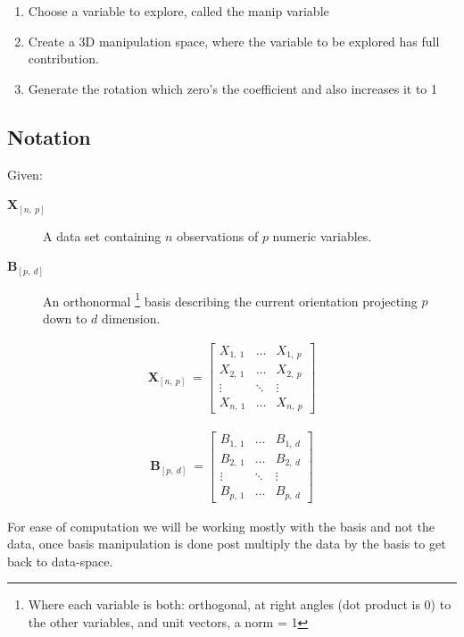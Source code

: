 \documentclass{monashthesis}
\begin{document}
\begin{enumerate}
\def\labelenumi{\arabic{enumi}.}
\tightlist
\item
  Choose a variable to explore, called the manip variable
\item
  Create a 3D manipulation space, where the variable to be explored has
  full contribution.
\item
  Generate the rotation which zero's the coefficient and also increases
  it to 1
\end{enumerate}

\subsection{Notation}\label{notation}

Given:

\begin{description}
  \item[$\textbf{X}_{[n,~p]}$] A data set containing $n$ observations of $p$ numeric variables. 
  \item[$\textbf{B}_{[p,~d]}$] An orthonormal \footnote{Where each variable is both: orthogonal, at right angles (dot product is 0) to the other variables, and unit vectors, a norm = 1} basis describing the current orientation projecting $p$ down to $d$ dimension.
\end{description}

\begin{align*}
  \textbf{X}_{[n,~p]} ~=
  \begin{bmatrix}
    X_{1,~1} & \dots  & X_{1,~p} \\
    X_{2,~1} & \dots  & X_{2,~p} \\
    \vdots   & \ddots & \vdots   \\
    X_{n,~1} & \dots  & X_{n,~p}
  \end{bmatrix}
\end{align*}

\begin{align*}
  \textbf{B}_{[p,~d]} ~=
  \begin{bmatrix}
    B_{1,~1} & \dots  & B_{1,~d} \\
    B_{2,~1} & \dots  & B_{2,~d} \\
    \vdots   & \ddots & \vdots   \\
    B_{p,~1} & \dots  & B_{p,~d}
  \end{bmatrix}
\end{align*}

For ease of computation we will be working mostly with the basis and not
the data, once basis manipulation is done post multiply the data by the
basis to get back to data-space.
\end{document}

